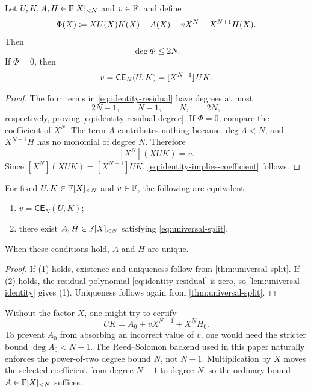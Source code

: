 \begin{lemma}
\label{lem:universal-identity}
Let $U,K,A,H\in\mathbb{F}[X]_{<N}$ and $v\in\mathbb{F}$, and define
\begin{equation}
  \Phi(X)
  \coloneqq
  XU(X)K(X)-A(X)-vX^N-X^{N+1}H(X).
  \label{eq:identity-residual}
\end{equation}
Then
\begin{equation}
  \deg\Phi\le2N.
  \label{eq:identity-residual-degree}
\end{equation}
If $\Phi=0$, then
\begin{equation}
  v=\mathsf{CE}_N(U,K)=[X^{N-1}]\,UK.
  \label{eq:identity-implies-coefficient}
\end{equation}
\end{lemma}

\begin{proof}
The four terms in \eqref{eq:identity-residual} have degrees at most
\[
  2N-1,\qquad N-1,\qquad N,\qquad 2N,
\]
respectively, proving \eqref{eq:identity-residual-degree}.  If $\Phi=0$, compare the coefficient of $X^N$.  The term $A$ contributes nothing because $\deg A<N$, and $X^{N+1}H$ has no monomial of degree $N$.  Therefore
\[
  [X^N](XUK)=v.
\]
Since $[X^N](XUK)=[X^{N-1}]UK$, \eqref{eq:identity-implies-coefficient} follows.
\end{proof}

\begin{corollary}
\label{cor:general-split-criterion}
For fixed $U,K\in\mathbb{F}[X]_{<N}$ and $v\in\mathbb{F}$, the following are equivalent:
\begin{enumerate}[label=(\arabic*),leftmargin=*]
  \item $v=\mathsf{CE}_N(U,K)$;
  \item there exist $A,H\in\mathbb{F}[X]_{<N}$ satisfying \eqref{eq:universal-split}.
\end{enumerate}
When these conditions hold, $A$ and $H$ are unique.
\end{corollary}

\begin{proof}
If (1) holds, existence and uniqueness follow from \cref{thm:universal-split}.  If (2) holds, the residual polynomial \eqref{eq:identity-residual} is zero, so \cref{lem:universal-identity} gives (1).  Uniqueness follows again from \cref{thm:universal-split}.
\end{proof}

\begin{remark}
\label{rem:factor-x}
Without the factor $X$, one might try to certify
\[
  UK=A_0+vX^{N-1}+X^NH_0.
\]
To prevent $A_0$ from absorbing an incorrect value of $v$, one would need the stricter bound $\deg A_0<N-1$.  The Reed--Solomon backend used in this paper naturally enforces the power-of-two degree bound $N$, not $N-1$.  Multiplication by $X$ moves the selected coefficient from degree $N-1$ to degree $N$, so the ordinary bound $A\in\mathbb{F}[X]_{<N}$ suffices.
\end{remark}

